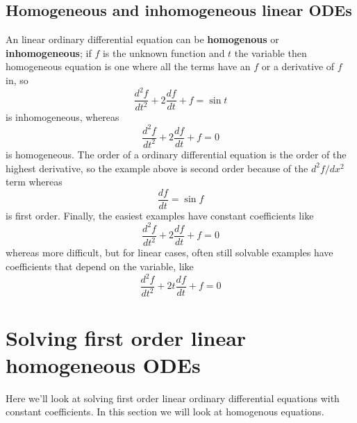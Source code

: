 \documentclass[12pt]{article}
\begin{document}
\subsection*{Homogeneous and inhomogeneous linear ODEs}
An linear ordinary differential equation can be \textbf{homogenous} or
\textbf{inhomogeneous}; if $f$ is the unknown function and $t$ the
variable then homogeneous equation is one where all the terms have an
$f$ or a derivative of $f$ in, so
\begin{equation}
  \frac{d^2f}{dt^2}+2\frac{df}{dt}+f=\sin{t}
\end{equation}
is inhomogeneous, whereas 
\begin{equation}
  \frac{d^2f}{dt^2}+2\frac{df}{dt}+f=0
\end{equation}
is homogeneous. The order of a ordinary differential equation is the order of the highest derivative, so the example above is second order because of the $d^2f/dx^2$ term whereas
\begin{equation}
  \frac{df}{dt}=\sin{f}
\end{equation}
is first order. Finally, the easiest examples have constant coefficients like
\begin{equation}
  \frac{d^2f}{dt^2}+2\frac{df}{dt}+f=0
\end{equation}
whereas more difficult, but for linear cases, often still solvable examples have coefficients that depend on the variable, like
\begin{equation}
  \frac{d^2f}{dt^2}+2t\frac{df}{dt}+f=0
\end{equation}

\section*{Solving first order linear homogeneous ODEs}

Here we'll look at solving first order linear ordinary differential
equations with constant coefficients. In this section we will look at homogenous equations.
\end{document}
